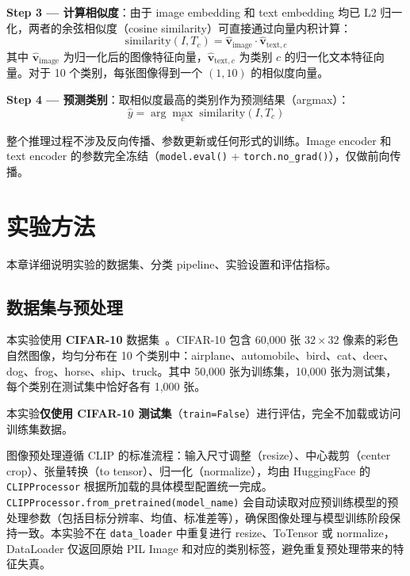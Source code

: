 \documentclass[12pt,a4paper]{ctexart}
\begin{document}
\textbf{Step 3 — 计算相似度}：由于 image embedding 和 text embedding 均已 L2 归一化，两者的余弦相似度（cosine similarity）可直接通过向量内积计算：
\begin{equation}
    \text{similarity}(I, T_c) = \hat{\mathbf{v}}_{\text{image}} \cdot \hat{\mathbf{v}}_{\text{text}, c}
\end{equation}
其中 $\hat{\mathbf{v}}_{\text{image}}$ 为归一化后的图像特征向量，$\hat{\mathbf{v}}_{\text{text}, c}$ 为类别 $c$ 的归一化文本特征向量。对于 10 个类别，每张图像得到一个 $(1, 10)$ 的相似度向量。

\textbf{Step 4 — 预测类别}：取相似度最高的类别作为预测结果（argmax）：
\begin{equation}
    \hat{y} = \arg\max_c \; \text{similarity}(I, T_c)
\end{equation}

整个推理过程不涉及反向传播、参数更新或任何形式的训练。Image encoder 和 text encoder 的参数完全冻结（\texttt{model.eval()} + \texttt{torch.no\_grad()}），仅做前向传播。

\section{实验方法}

本章详细说明实验的数据集、分类 pipeline、实验设置和评估指标。

\subsection{数据集与预处理}

本实验使用 \textbf{CIFAR-10} 数据集~\cite{krizhevsky2009cifar}。CIFAR-10 包含 60,000 张 $32\times32$ 像素的彩色自然图像，均匀分布在 10 个类别中：airplane、automobile、bird、cat、deer、dog、frog、horse、ship、truck。其中 50,000 张为训练集，10,000 张为测试集，每个类别在测试集中恰好各有 1,000 张。

本实验\textbf{仅使用 CIFAR-10 测试集}（\texttt{train=False}）进行评估，完全不加载或访问训练集数据。

图像预处理遵循 CLIP 的标准流程：输入尺寸调整（resize）、中心裁剪（center crop）、张量转换（to tensor）、归一化（normalize），均由 HuggingFace 的 \texttt{CLIPProcessor} 根据所加载的具体模型配置统一完成。\texttt{CLIPProcessor.from\_pretrained(model\_name)} 会自动读取对应预训练模型的预处理参数（包括目标分辨率、均值、标准差等），确保图像处理与模型训练阶段保持一致。本实验不在 \texttt{data\_loader} 中重复进行 resize、ToTensor 或 normalize，DataLoader 仅返回原始 PIL Image 和对应的类别标签，避免重复预处理带来的特征失真。
\end{document}
